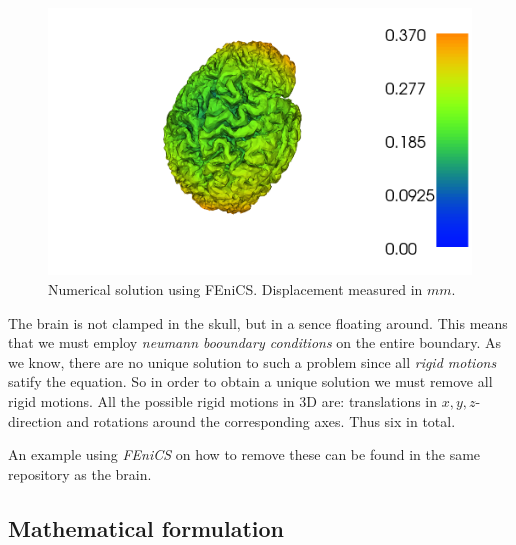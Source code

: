 \documentclass[epsfig,11pt]{article}
\begin{document}
 \begin{figure}[h!] 
\begin{center}
  \includegraphics[scale=0.4]{brain.png}
  \end{center}
  \caption{Numerical solution using FEniCS. Displacement measured in $mm$.}
\end{figure}

The brain is not clamped in the skull, but in a sence floating around. This means that we must employ \emph{neumann booundary conditions} on the entire boundary. As we know, there are no unique solution to such a problem since all \emph{rigid motions} satify the equation. So in order to obtain a unique solution we must remove all rigid motions. All the possible rigid motions in 3D are: translations in $x,y,z$-direction and rotations around the corresponding axes. Thus six in total.

An example using \emph{FEniCS} on how to remove these can be found in the same repository as the brain. 

\subsection{Mathematical formulation}
\end{document}
